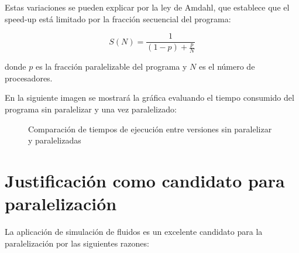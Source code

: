 \documentclass[12pt,a4paper]{article}
\begin{document}
	Estas variaciones se pueden explicar por la ley de Amdahl, que establece que el speed-up está limitado por la fracción secuencial del programa:
	
	\[
	S(N) = \frac{1}{(1-p) + \frac{p}{N}}
	\]
	
	donde $p$ es la fracción paralelizable del programa y $N$ es el número de procesadores.
	
	En la siguiente imagen se mostrará la gráfica evaluando el tiempo consumido del programa sin paralelizar y una vez paralelizado: 
	
	\begin{figure}[h]
		\centering
		\caption{Comparación de tiempos de ejecución entre versiones sin paralelizar y paralelizadas}
		\label{fig:execution_time_comparison}
	\end{figure}
	
	\newpage
	
	\section{Justificación como candidato para paralelización}
	La aplicación de simulación de fluidos es un excelente candidato para la paralelización por las siguientes razones:
	
\end{document}
